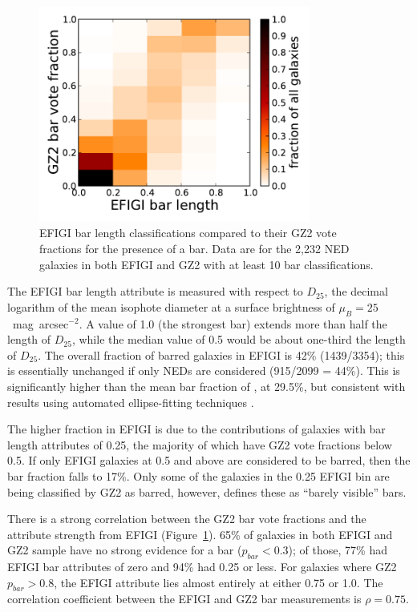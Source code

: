\documentclass[useAMS,usenatbib]{mn2e}
\providecommand{\DIFaddtex}[1]{{\protect\color{blue}\uwave{#1}}} %
\providecommand{\DIFdeltex}[1]{{\protect\color{red}\sout{#1}}}                      %
\providecommand{\DIFaddbegin}{} %
\providecommand{\DIFaddend}{} %
\providecommand{\DIFdelbegin}{} %
\providecommand{\DIFdelend}{} %
\providecommand{\DIFadd}[1]{\texorpdfstring{\DIFaddtex{#1}}{#1}} %
\providecommand{\DIFdel}[1]{\texorpdfstring{\DIFdeltex{#1}}{}} %
\begin{document}
\begin{figure}
\includegraphics[angle=0,width=3.5in]{figures/efigi_bars.pdf}
\caption{EFIGI bar length classifications compared to their GZ2 vote fractions for the presence of a bar. Data are for the 2,232 NED galaxies in both EFIGI and GZ2 with at least 10 bar classifications. 
\label{fig-efigi_bars}}
\end{figure}

The EFIGI bar length attribute is measured with respect to $D_{25}$, the decimal logarithm of the mean isophote diameter at a surface brightness of $\mu_B=25$~mag~arcsec$^{-2}$. A value of 1.0 (the strongest bar) extends more than half the length of $D_{25}$, while the median value of 0.5 would be about one-third the length of $D_{25}$. The overall fraction of barred galaxies in EFIGI is 42\% (1439/3354); this is essentially unchanged if only NEDs are considered (915/2099 = 44\%). This is significantly higher than the mean bar fraction of \citet{mas11c}, at 29.5\%, but consistent with results using automated ellipse-fitting techniques \citep{bar08,agu09}. 

The higher fraction in EFIGI is due to the contributions of galaxies with bar length attributes of 0.25, the majority of which have GZ2 vote fractions below 0.5. If only EFIGI galaxies at 0.5 and above are considered to be barred, then the bar fraction falls to 17\%. Only some of the galaxies in the 0.25 EFIGI bin are being classified by GZ2 as barred, however, \citet{bai11} defines these as \DIFaddbegin \DIFadd{a }\DIFaddend ``barely visible'' bars. %

There is a strong correlation between the GZ2 bar vote fractions and the attribute strength from EFIGI (Figure~\ref{fig-efigi_bars}). 65\% of galaxies in both EFIGI and GZ2 sample have no strong evidence for a bar (\DIFdelbegin \DIFdel{$p_{bar}<0.3$}\DIFdelend \DIFaddbegin \DIFadd{$p_\mathrm{bar}<0.3$}\DIFaddend ); of those, 77\% had EFIGI bar attributes of zero and 94\% had 0.25 or less. For galaxies where GZ2 \DIFdelbegin \DIFdel{$p_{bar}>0.8$}\DIFdelend \DIFaddbegin \DIFadd{$p_\mathrm{bar}>0.8$}\DIFaddend , the EFIGI attribute lies almost entirely at either 0.75 or 1.0. The correlation coefficient between the EFIGI and GZ2 bar measurements is $\rho=0.75$. 
\end{document}
